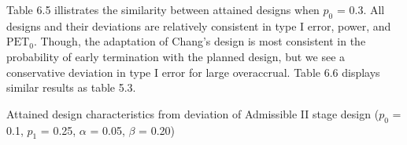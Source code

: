 \documentclass[12pt]{report}\usepackage[]{graphicx}\usepackage[]{color}
\newlength{\li}\setlength{\li}{14.48pt}
\newlength{\di}\setlength{\di}{-3.5mm}
\begin{document}
Table 6.5 illistrates the similarity between attained designs when $p_0$ = 0.3. All designs and their deviations are relatively consistent in type I error, power, and $\mbox{PET}_0$. Though, the adaptation of Chang's design is most consistent in the probability of early termination with the planned design, but we see a conservative deviation in type I error for large overaccrual. Table 6.6 displays similar results as table 5.3. \\




\begin{landscape}

\begin{table}[]
\caption{Attained design characteristics from deviation of Admissible II stage design ($p_0$ = 0.1, $p_1$ = 0.25, $\alpha$ = 0.05, $\beta$ = 0.20)}
\small
  \resizebox{\columnwidth}{!}{%

}
\end{table}
\end{landscape}
\end{document}
